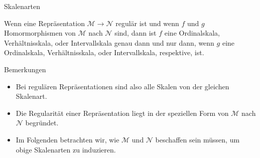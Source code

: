\documentclass[
  8pt,
  ignorenonframetext,
]{beamer}
\providecommand{\tightlist}{%
  \setlength{\itemsep}{0pt}\setlength{\parskip}{0pt}}
\begin{document}
\begin{frame}{Skalenarten}
\protect\hypertarget{skalenarten-3}{}
\small
\begin{theorem}[Skalenart]
\justifying
\normalfont
Wenn eine Repräsentation $\mathcal{M} \to  \mathcal{N}$ regulär ist und wenn
$f$ und $g$ Homormorphismen von $\mathcal{M}$ nach $\mathcal{N}$ sind, dann ist 
$f$ eine Ordinalskala, Verhältnisskala, oder Intervallskala genau dann und nur 
dann, wenn $g$ eine Ordinalskala, Verhältnisskala, oder Intervallskala, respektive, ist.
\end{theorem}
\footnotesize

Bemerkungen

\begin{itemize}
\tightlist
\item
  Bei regulären Repräsentationen sind also alle Skalen von der gleichen
  Skalenart.
\item
  Die Regularität einer Repräsentation liegt in der speziellen Form von
  \(\mathcal{M}\) nach \(\mathcal{N}\) begründet.
\item
  Im Folgenden betrachten wir, wie \(\mathcal{M}\) und \(\mathcal{N}\)
  beschaffen sein müssen, um obige Skalenarten zu induzieren.
\end{itemize}
\end{frame}
\end{document}
